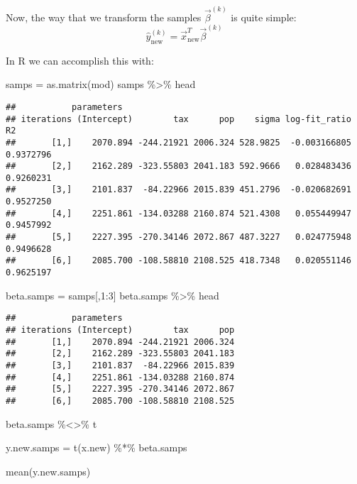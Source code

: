 \documentclass[
]{article}
\newenvironment{Shaded}{\begin{snugshade}}{\end{snugshade}}
\newcommand{\DecValTok}[1]{\textcolor[rgb]{0.00,0.00,0.81}{#1}}
\newcommand{\FunctionTok}[1]{\textcolor[rgb]{0.00,0.00,0.00}{#1}}
\newcommand{\NormalTok}[1]{#1}
\newcommand{\OtherTok}[1]{\textcolor[rgb]{0.56,0.35,0.01}{#1}}
\newcommand{\SpecialCharTok}[1]{\textcolor[rgb]{0.00,0.00,0.00}{#1}}
\begin{document}
Now, the way that we transform the samples \(\vec \beta^{(k)}\) is quite
simple: \[
\hat y_{\text{new}}^{(k)} = \vec x_{\text{new}}^T \vec \beta^{(k)}
\]

In R we can accomplish this with:

\begin{Shaded}
\begin{Highlighting}[]
\NormalTok{samps }\OtherTok{=} \FunctionTok{as.matrix}\NormalTok{(mod)}
\NormalTok{samps }\SpecialCharTok{\%\textgreater{}\%}\NormalTok{ head}
\end{Highlighting}
\end{Shaded}

\begin{verbatim}
##           parameters
## iterations (Intercept)        tax      pop    sigma log-fit_ratio        R2
##       [1,]    2070.894 -244.21921 2006.324 528.9825  -0.003166805 0.9372796
##       [2,]    2162.289 -323.55803 2041.183 592.9666   0.028483436 0.9260231
##       [3,]    2101.837  -84.22966 2015.839 451.2796  -0.020682691 0.9527250
##       [4,]    2251.861 -134.03288 2160.874 521.4308   0.055449947 0.9457992
##       [5,]    2227.395 -270.34146 2072.867 487.3227   0.024775948 0.9496628
##       [6,]    2085.700 -108.58810 2108.525 418.7348   0.020551146 0.9625197
\end{verbatim}

\begin{Shaded}
\begin{Highlighting}[]
\NormalTok{beta.samps }\OtherTok{=}\NormalTok{ samps[,}\DecValTok{1}\SpecialCharTok{:}\DecValTok{3}\NormalTok{]}
\NormalTok{beta.samps }\SpecialCharTok{\%\textgreater{}\%}\NormalTok{ head}
\end{Highlighting}
\end{Shaded}

\begin{verbatim}
##           parameters
## iterations (Intercept)        tax      pop
##       [1,]    2070.894 -244.21921 2006.324
##       [2,]    2162.289 -323.55803 2041.183
##       [3,]    2101.837  -84.22966 2015.839
##       [4,]    2251.861 -134.03288 2160.874
##       [5,]    2227.395 -270.34146 2072.867
##       [6,]    2085.700 -108.58810 2108.525
\end{verbatim}

\begin{Shaded}
\begin{Highlighting}[]
\NormalTok{beta.samps }\SpecialCharTok{\%\textless{}\textgreater{}\%}\NormalTok{ t}

\NormalTok{y.new.samps }\OtherTok{=} \FunctionTok{t}\NormalTok{(x.new) }\SpecialCharTok{\%*\%}\NormalTok{ beta.samps}

\FunctionTok{mean}\NormalTok{(y.new.samps)}
\end{Highlighting}
\end{Shaded}
\end{document}
